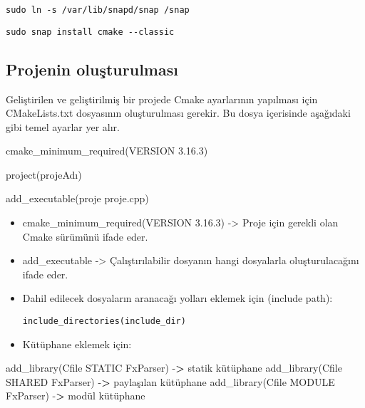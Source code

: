 \documentclass[
]{book}
\newenvironment{Shaded}{\begin{snugshade}}{\end{snugshade}}
\newcommand{\ExtensionTok}[1]{#1}
\newcommand{\NormalTok}[1]{#1}
\newcommand{\OperatorTok}[1]{\textcolor[rgb]{0.81,0.36,0.00}{\textbf{#1}}}
\begin{document}
\texttt{sudo\ ln\ -s\ /var/lib/snapd/snap\ /snap}

\texttt{sudo\ snap\ install\ cmake\ -\/-classic}

\hypertarget{projenin-oluux15fturulmasux131}{%
\subsection{Projenin oluşturulması}\label{projenin-oluux15fturulmasux131}}

Geliştirilen ve geliştirilmiş bir projede Cmake ayarlarının yapılması için CMakeLists.txt dosyasının oluşturulması gerekir.
Bu dosya içerisinde aşağıdaki gibi temel ayarlar yer alır.

\begin{Shaded}
\begin{Highlighting}[]
\ExtensionTok{cmake\_minimum\_required}\NormalTok{(VERSION 3.16.3) }

\ExtensionTok{project}\NormalTok{(projeAdı)}

\ExtensionTok{add\_executable}\NormalTok{(proje proje.cpp) }
\end{Highlighting}
\end{Shaded}

\begin{itemize}
\item
  cmake\_minimum\_required(VERSION 3.16.3) -\textgreater{} Proje için gerekli olan Cmake sürümünü
  ifade eder.
\item
  add\_executable -\textgreater{} Çalıştırılabilir dosyanın hangi dosyalarla oluşturulacağını ifade eder.
\item
  Dahil edilecek dosyaların aranacağı yolları eklemek için (include path):

  \texttt{include\_directories(include\_dir)}
\item
  Kütüphane eklemek için:
\end{itemize}

\begin{Shaded}
\begin{Highlighting}[]
   \ExtensionTok{add\_library}\NormalTok{(Cfile STATIC FxParser) }\ExtensionTok{{-}}\OperatorTok{>}\NormalTok{ statik kütüphane}
   \ExtensionTok{add\_library}\NormalTok{(Cfile SHARED FxParser) }\ExtensionTok{{-}}\OperatorTok{>}\NormalTok{ paylaşılan kütüphane}
   \ExtensionTok{add\_library}\NormalTok{(Cfile MODULE FxParser) }\ExtensionTok{{-}}\OperatorTok{>}\NormalTok{ modül kütüphane }
\end{Highlighting}
\end{Shaded}
\end{document}
